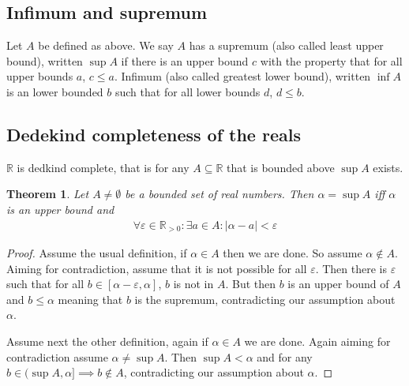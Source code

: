 \documentclass{article}
\newtheorem{theorem}{Theorem}[section]
\begin{document}
\subsection{Infimum and supremum}
Let $A$ be defined as above. We say $A$ has a supremum (also called least upper
bound), written $\sup A$ if there is an upper bound $c$ with the property that 
for all upper bounds $a$, $c\leq a$. Infimum (also called greatest lower bound),
written $\inf A$ is an lower bounded $b$ such that for all lower bounds 
$d$, $d \leq b$.
\subsection{Dedekind completeness of the reals}
$\mathbb{R}$ is dedkind complete, that is for any $A \subseteq \mathbb{R}$ that
is bounded above $\sup A$ exists.

\begin{theorem}
	Let $A \neq \emptyset$ be a bounded set of real numbers. Then $\alpha = \sup
	A$ iff $\alpha$ is an upper bound and
\begin{align*}
	\forall \varepsilon \in \mathbb{R}_{>0}: \exists a \in A: |\alpha-a| <
	\varepsilon
\end{align*}
\end{theorem}
\begin{proof}
	Assume the usual definition, if $\alpha \in A$ then we are done. So assume
	$\alpha \notin A$. Aiming for contradiction, assume that it is not possible 
	for all $\varepsilon$. Then there is $\varepsilon$ such that
	for all $b \in [\alpha-\varepsilon,\alpha]$, $b$ is not in $A$.
	But then $b$ is an upper bound of $A$ and $b \leq \alpha$ meaning that $b$
	is the supremum, contradicting our assumption about $\alpha$.

	Assume next the other definition, again if $\alpha \in A$ we are done. Again
	aiming for contradiction assume $\alpha \neq \sup A$. Then $\sup A <
	\alpha$ and for any $b  \in (\sup A, \alpha] \implies b \notin A$,
	contradicting our assumption about $\alpha$.
\end{proof}
\end{document}
